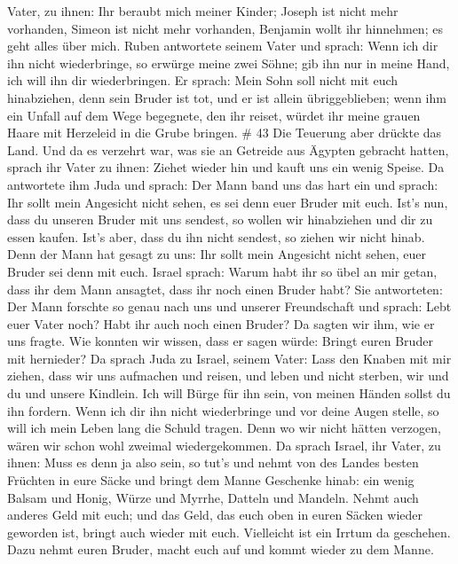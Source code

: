 Vater, zu ihnen: Ihr beraubt mich meiner Kinder; Joseph ist nicht mehr
vorhanden, Simeon ist nicht mehr vorhanden, Benjamin wollt ihr
hinnehmen; es geht alles über mich.  Ruben antwortete
seinem Vater und sprach: Wenn ich dir ihn nicht wiederbringe, so erwürge
meine zwei Söhne; gib ihn nur in meine Hand, ich will ihn dir
wiederbringen.  Er sprach: Mein Sohn soll nicht mit euch
hinabziehen, denn sein Bruder ist tot, und er ist allein übriggeblieben;
wenn ihm ein Unfall auf dem Wege begegnete, den ihr reiset, würdet ihr
meine grauen Haare mit Herzeleid in die Grube bringen. \# 43
 Die Teuerung aber drückte das Land.  Und da es
verzehrt war, was sie an Getreide aus Ägypten gebracht hatten, sprach
ihr Vater zu ihnen: Ziehet wieder hin und kauft uns ein wenig Speise.
 Da antwortete ihm Juda und sprach: Der Mann band uns das
hart ein und sprach: Ihr sollt mein Angesicht nicht sehen, es sei denn
euer Bruder mit euch.  Ist's nun, dass du unseren Bruder mit
uns sendest, so wollen wir hinabziehen und dir zu essen kaufen.
 Ist's aber, dass du ihn nicht sendest, so ziehen wir nicht
hinab. Denn der Mann hat gesagt zu uns: Ihr sollt mein Angesicht nicht
sehen, euer Bruder sei denn mit euch.  Israel sprach: Warum
habt ihr so übel an mir getan, dass ihr dem Mann ansagtet, dass ihr noch
einen Bruder habt?  Sie antworteten: Der Mann forschte so
genau nach uns und unserer Freundschaft und sprach: Lebt euer Vater
noch? Habt ihr auch noch einen Bruder? Da sagten wir ihm, wie er uns
fragte. Wie konnten wir wissen, dass er sagen würde: Bringt euren Bruder
mit hernieder?  Da sprach Juda zu Israel, seinem Vater: Lass
den Knaben mit mir ziehen, dass wir uns aufmachen und reisen, und leben
und nicht sterben, wir und du und unsere Kindlein.  Ich will
Bürge für ihn sein, von meinen Händen sollst du ihn fordern. Wenn ich
dir ihn nicht wiederbringe und vor deine Augen stelle, so will ich mein
Leben lang die Schuld tragen.  Denn wo wir nicht hätten
verzogen, wären wir schon wohl zweimal wiedergekommen.  Da
sprach Israel, ihr Vater, zu ihnen: Muss es denn ja also sein, so tut's
und nehmt von des Landes besten Früchten in eure Säcke und bringt dem
Manne Geschenke hinab: ein wenig Balsam und Honig, Würze und Myrrhe,
Datteln und Mandeln.  Nehmt auch anderes Geld mit euch; und
das Geld, das euch oben in euren Säcken wieder geworden ist, bringt auch
wieder mit euch. Vielleicht ist ein Irrtum da geschehen. 
Dazu nehmt euren Bruder, macht euch auf und kommt wieder zu dem Manne.
